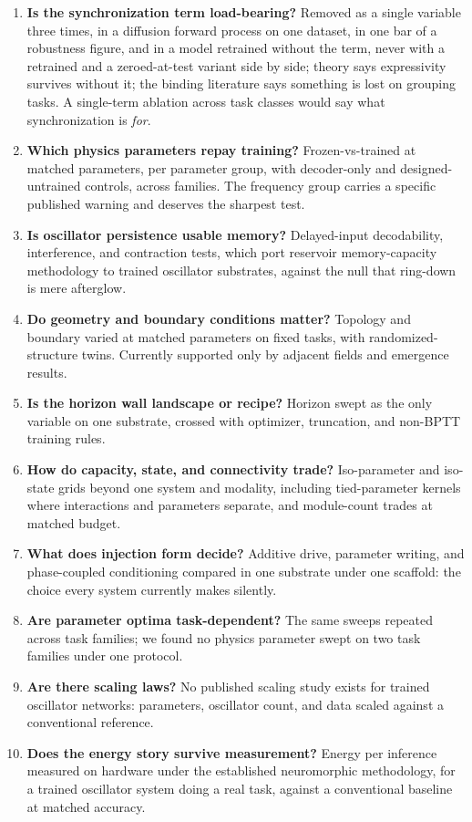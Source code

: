 \documentclass[a4paper,fleqn]{cas-sc}
\providecommand{\tightlist}{%
  \setlength{\itemsep}{0pt}\setlength{\parskip}{0pt}}
\begin{document}
\begin{enumerate}
\def\labelenumi{\arabic{enumi}.}
\tightlist
\item
  \textbf{Is the synchronization term load-bearing?} Removed as a single
  variable three times, in a diffusion forward process on one dataset,
  in one bar of a robustness figure, and in a model retrained without
  the term, never with a retrained and a zeroed-at-test variant side by
  side; theory says expressivity survives without it; the binding
  literature says something is lost on grouping tasks. A single-term
  ablation across task classes would say what synchronization is
  \emph{for}.
\item
  \textbf{Which physics parameters repay training?} Frozen-vs-trained at
  matched parameters, per parameter group, with decoder-only and
  designed-untrained controls, across families. The frequency group
  carries a specific published warning and deserves the sharpest test.
\item
  \textbf{Is oscillator persistence usable memory?} Delayed-input
  decodability, interference, and contraction tests, which port
  reservoir memory-capacity methodology to trained oscillator
  substrates, against the null that ring-down is mere afterglow.
\item
  \textbf{Do geometry and boundary conditions matter?} Topology and
  boundary varied at matched parameters on fixed tasks, with
  randomized-structure twins. Currently supported only by adjacent
  fields and emergence results.
\item
  \textbf{Is the horizon wall landscape or recipe?} Horizon swept as the
  only variable on one substrate, crossed with optimizer, truncation,
  and non-BPTT training rules.
\item
  \textbf{How do capacity, state, and connectivity trade?} Iso-parameter
  and iso-state grids beyond one system and modality, including
  tied-parameter kernels where interactions and parameters separate, and
  module-count trades at matched budget.
\item
  \textbf{What does injection form decide?} Additive drive, parameter
  writing, and phase-coupled conditioning compared in one substrate
  under one scaffold: the choice every system currently makes silently.
\item
  \textbf{Are parameter optima task-dependent?} The same sweeps repeated
  across task families; we found no physics parameter swept on two task
  families under one protocol.
\item
  \textbf{Are there scaling laws?} No published scaling study exists for
  trained oscillator networks: parameters, oscillator count, and data
  scaled against a conventional reference.
\item
  \textbf{Does the energy story survive measurement?} Energy per
  inference measured on hardware under the established neuromorphic
  methodology, for a trained oscillator system doing a real task,
  against a conventional baseline at matched accuracy.
\end{enumerate}
\end{document}
